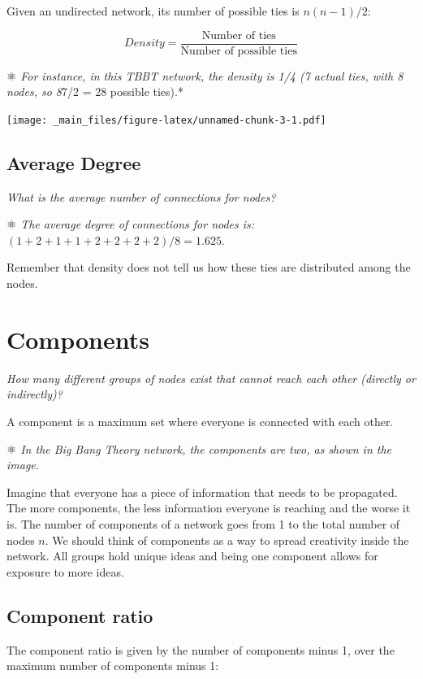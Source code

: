\documentclass[
  notitlepage,
  onecolumn,
  openany]{book}
\begin{document}
Given an undirected network, its number of possible ties is \(n(n-1)/2\):

\[
Density = \frac{\text{Number of ties}}{\text{Number of possible ties}}
\]

⚛️ \emph{For instance, in this TBBT network, the density is 1/4 (7 actual ties, with 8 nodes, so 8}7/2 = 28 possible ties).*

\texttt{[image: \_main\_files/figure-latex/unnamed-chunk-3-1.pdf]}

\hypertarget{average-degree-1}{%
\subsection{Average Degree}\label{average-degree-1}}

\emph{What is the average number of connections for nodes?}

⚛️ \emph{The average degree of connections for nodes is:} \((1+2+1+1+2+2+2+2)/8 = 1.625\).

Remember that density does not tell us how these ties are distributed among the nodes.

\hypertarget{components}{%
\section{Components}\label{components}}

\emph{How many different groups of nodes exist that cannot reach each other (directly or indirectly)?}

A component is a maximum set where everyone is connected with each other.

⚛️ \emph{In the Big Bang Theory network, the components are two, as shown in the image}.

Imagine that everyone has a piece of information that needs to be propagated. The more components, the less information everyone is reaching and the worse it is. The number of components of a network goes from 1 to the total number of nodes \(n\). We should think of components as a way to spread creativity inside the network. All groups hold unique ideas and being one component allows for exposure to more ideas.

\hypertarget{component-ratio}{%
\subsection{Component ratio}\label{component-ratio}}

The component ratio is given by the number of components minus 1, over the maximum number of components minus 1:
\end{document}
